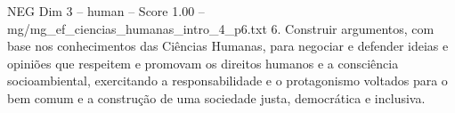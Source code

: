 \begin{textsample}{NEG Dim 3 – human – Score 1.00 – mg/mg\_ef\_ciencias\_humanas\_intro\_4\_p6.txt}  \label{ex:f3_neg_013}
6.
Construir argumentos, com base nos conhecimentos das Ciências Humanas, para negociar e defender ideias e opiniões que respeitem e promovam os direitos humanos e a consciência socioambiental, exercitando a responsabilidade e o protagonismo voltados para o bem comum e a construção de uma sociedade justa, democrática e inclusiva.

\end{textsample}
